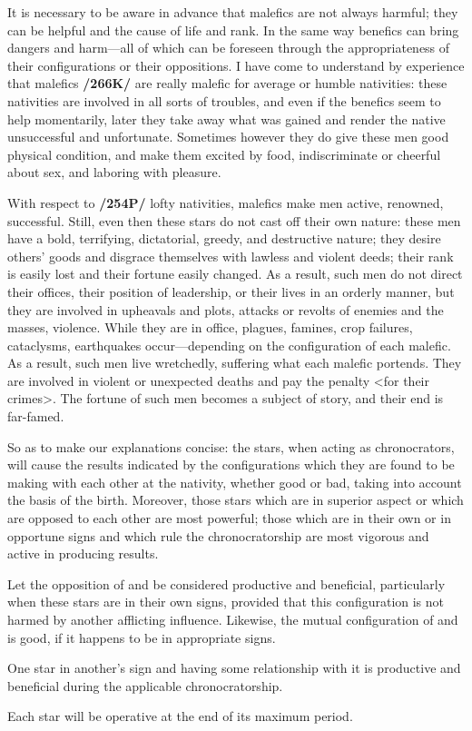 It is necessary to be aware in advance that malefics are not always harmful; they can be helpful and the cause of life and rank. In the same way benefics can bring dangers and harm—all of which can be foreseen through the appropriateness of their configurations or their oppositions. I have come to understand by experience that malefics \textbf{/266K/} are really malefic for average or humble nativities: these nativities are involved in all sorts of troubles, and even if the benefics seem to help momentarily, later they take away what was gained and render the native unsuccessful and unfortunate. Sometimes however they do give these men good physical condition, and make them excited by food, indiscriminate or cheerful about sex, and laboring with pleasure.

With respect to \textbf{/254P/} lofty nativities, malefics make men active, renowned, successful. Still, even then these stars do not cast off their own nature: these men have a bold, terrifying, dictatorial, greedy, and destructive nature; they desire others’ goods and disgrace themselves with lawless and violent deeds; their rank is easily lost and their fortune easily changed. As a result, such men do not direct their offices, their position of leadership, or their lives in an orderly manner, but they are involved in upheavals and plots, attacks or revolts of enemies and the masses, violence. While they are in office, plagues, famines, crop failures, cataclysms, earthquakes occur—depending on the configuration of each malefic. As a result, such men live wretchedly, suffering what each malefic portends. They are involved in violent or unexpected deaths and pay the penalty <for their crimes>. The fortune of such men becomes a subject of story, and
their end is far-famed. 

So as to make our explanations concise: the stars, when acting as chronocrators, will cause the results indicated by the configurations which they are found to be making with each other at the nativity, whether good or bad, taking into account the basis of the birth. Moreover, those stars which are in superior aspect or which are opposed to each other are most powerful; those which are in their own or in opportune signs and which rule the chronocratorship are most vigorous and active in producing results. 

Let the opposition of \Saturn\xspace and \Jupiter\xspace be considered productive and beneficial, particularly when these stars are in their own
signs, provided that this configuration is not harmed by another afflicting influence. Likewise, the mutual configuration of \Jupiter\xspace and \Mars\xspace is good, if it happens to be in appropriate signs. 

One star in another’s sign and having some relationship with it is productive and beneficial during the applicable chronocratorship. 

Each star will be operative at the end of its maximum period.

\newpage